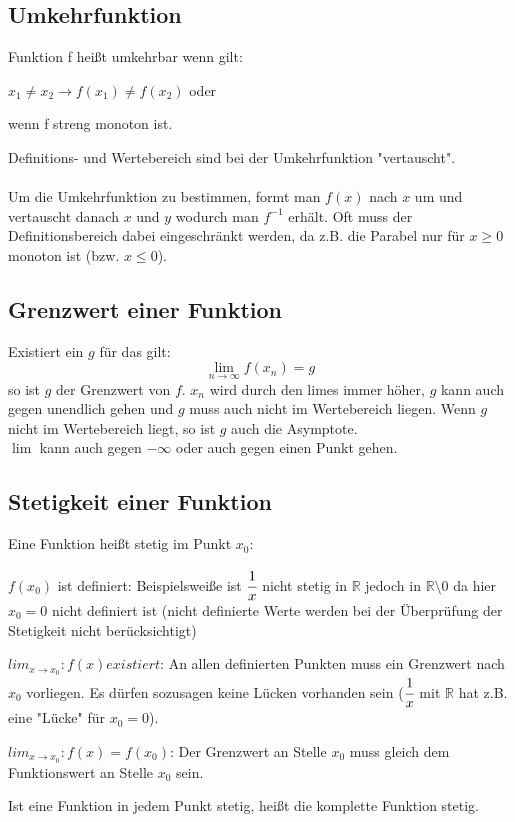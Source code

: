 \documentclass[a4paper]{scrartcl}
\begin{document}
    \subsection{Umkehrfunktion}
    Funktion f heißt umkehrbar wenn gilt:     
    \begin{description}
        \item $x_1 \neq x_2 \rightarrow f(x_1) \neq f(x_2)$ oder
        \item wenn f streng monoton ist.
        \end{description}
    Definitions- und Wertebereich sind bei der Umkehrfunktion "vertauscht". \\  
    \\ Um die Umkehrfunktion zu bestimmen, formt man $f(x)$ nach $x$ um und vertauscht danach $x$ und $y$ wodurch man $f^{-1}$ erhält.
    Oft muss der Definitionsbereich dabei eingeschränkt werden, da z.B. die Parabel nur für $x \geq 0$ monoton ist (bzw. $x \leq 0$). 

    \subsection{Grenzwert einer Funktion}
    Existiert ein $g$ für das gilt:
    \begin{equation*}
        \lim \limits_{n \to \infty}f(x_n) = g
    \end{equation*} 
    so ist $g$ der Grenzwert von $f$.
    $x_n$ wird durch den limes immer höher, $g$ kann auch gegen unendlich gehen und $g$ muss auch nicht im Wertebereich liegen. Wenn $g$ nicht im Wertebereich liegt, so ist $g$ auch die Asymptote. \\
    $\lim$ kann auch gegen $-\infty$ oder auch gegen einen Punkt gehen.

    \subsection{Stetigkeit einer Funktion}
        Eine Funktion heißt stetig im Punkt $x_0$:
        \begin{description}
            \item $f(x_0)$ ist definiert: Beispielsweiße ist $\cfrac{1}{x}$ nicht stetig in $\mathbb{R}$ jedoch in $\mathbb{R} \setminus 0$ da hier $x_0 = 0$ nicht definiert ist (nicht definierte Werte werden bei der Überprüfung der Stetigkeit nicht berücksichtigt)
            \item $lim_{x \to x_0}: f(x) existiert$: An allen definierten Punkten muss ein Grenzwert nach $x_0$ vorliegen. Es dürfen sozusagen keine Lücken vorhanden sein ($\cfrac{1}{x}$ mit $\mathbb{R}$ hat z.B. eine "Lücke" für $x_0 = 0$).
            \item $lim_{x \to x_0}: f(x) = f(x_0)$: Der Grenzwert an Stelle $x_0$ muss gleich dem Funktionswert an Stelle $x_0$ sein.
        \end{description}
        Ist eine Funktion in jedem Punkt stetig, heißt die komplette Funktion stetig.
\end{document}
